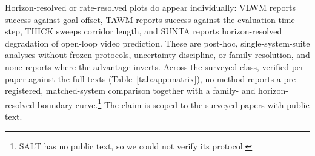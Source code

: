 Horizon-resolved or rate-resolved plots do appear individually: VLWM reports success against goal offset, TAWM reports success against the evaluation time step, THICK sweeps corridor length, and SUNTA reports horizon-resolved degradation of open-loop video prediction. These are post-hoc, single-system-suite analyses without frozen protocols, uncertainty discipline, or family resolution, and none reports where the advantage inverts. Across the surveyed class, verified per paper against the full texts (Table~\ref{tab:app:matrix}), no method reports a pre-registered, matched-system comparison together with a family- and horizon-resolved boundary curve.\footnote{SALT has no public text, so we could not verify its protocol.} The claim is scoped to the surveyed papers with public text. %

